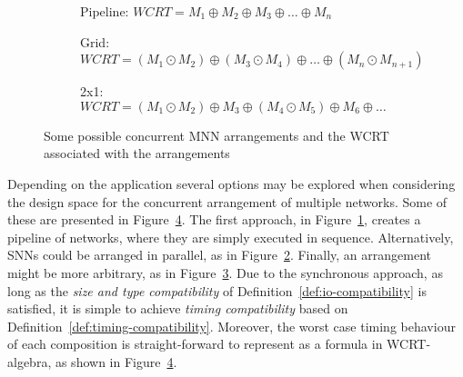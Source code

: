 \begin{figure}[h]
	\centering
	\begin{subfigure}[t]{0.5\textwidth}
		\centering
		\scalebox{0.8}{}
		\caption{Pipeline: $WCRT = M_1 \oplus M_2 \oplus M_3 \oplus \ldots \oplus M_n$}
		\label{fig:tca-nn-pipeline}
	\end{subfigure}
	
	\vspace{10mm}
	\begin{subfigure}[h]{0.5\textwidth}
		\centering
		\scalebox{0.8}{}
		\caption{Grid: $WCRT = \left(M_1 \odot M_2\right) \oplus \left(M_3 \odot M_4\right) \oplus \ldots \oplus \left(M_n \odot M_{n+1}\right)$}
		\label{fig:tca-nn-grid}
	\end{subfigure}
	
	\vspace{10mm}
	\begin{subfigure}[h]{0.5\textwidth}
		\centering
		\scalebox{0.8}{}
		\caption{2x1: $WCRT = \left(M_1 \odot M_2\right) \oplus M_3 \oplus \left(M_4 \odot M_5\right) \oplus M_6 \oplus \ldots$}
		\label{fig:tca-nn-someparallel}
	\end{subfigure}
	
	\caption{Some possible concurrent \ac{MNN} arrangements and the \ac{WCRT} associated with the arrangements}
	\label{fig:tca-nn}
\end{figure}

Depending on the application several options may be explored when
considering the design space for the concurrent arrangement of
multiple networks. Some of these are presented in Figure~\ref{fig:tca-nn}.
The first approach, in Figure~\ref{fig:tca-nn-pipeline}, creates a pipeline of networks, where they are simply executed in sequence.
Alternatively, \acp{SNN} could be arranged in parallel, as in Figure~\ref{fig:tca-nn-grid}. 
Finally, an arrangement might be more arbitrary, as in Figure~\ref{fig:tca-nn-someparallel}. 
Due to the synchronous approach, as long as the \emph{size and type
	compatibility} of Definition~\ref{def:io-compatibility} is
satisfied, it is simple to achieve \emph{timing compatibility} based on Definition~\ref{def:timing-compatibility}. 
Moreover, the worst case timing behaviour of each composition is
straight-forward to represent as a formula in \ac{WCRT}-algebra, as
shown in Figure~\ref{fig:tca-nn}.

